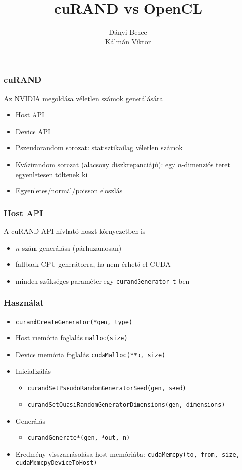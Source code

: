 \documentclass[xetex]{beamer}
\title{cuRAND vs OpenCL}
\author{Dányi Bence\\ Kálmán Viktor}
\begin{document}
  \frame{\titlepage}
  \begin{frame}
    \frametitle{cuRAND}
    Az NVIDIA megoldása véletlen számok generálására
    \begin{itemize}
      \item Host API
      \item Device API
      \item Pszeudorandom sorozat: statisztikailag véletlen számok
      \item Kvázirandom sorozat (alacsony diszkrepanciájú): egy $n$-dimenziós teret egyenletesen töltenek ki
      \item Egyenletes/normál/poisson eloszlás
    \end{itemize}
  \end{frame}
  \begin{frame}
    \frametitle{Host API}
    A cuRAND API hívható hoszt környezetben is
    \begin{itemize}
      \item $n$ szám generálása (párhuzamosan)
      \item fallback CPU generátorra, ha nem érhető el CUDA
      \item minden szükséges paraméter egy \texttt{curandGenerator\_t}-ben
    \end{itemize}
  \end{frame}
  \begin{frame}
    \frametitle{Használat}
    \begin{itemize}
      \item \texttt{curandCreateGenerator(*gen, type)}
      \item Host memória foglalás \texttt{malloc(size)}
      \item Device memória foglalás \texttt{cudaMalloc(**p, size)}
      \item Inicializálás
        \begin{itemize}
          \item \texttt{curandSetPseudoRandomGeneratorSeed(gen, seed)}
          \item \texttt{curandSetQuasiRandomGeneratorDimensions(gen, dimensions)}
        \end{itemize}
      \item Generálás
      \begin{itemize}
        \item \texttt{curandGenerate*(gen, *out, n)}
      \end{itemize}
      \item Eredmény visszamásolása host memóriába: \texttt{cudaMemcpy(to, from, size, cudaMemcpyDeviceToHost)}
    \end{itemize}
  \end{frame}
\end{document}
